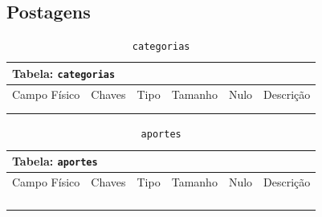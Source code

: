 \documentclass[12pt,a4paper]{article}
\begin{document}
\subsection{Postagens}


\begin{center}
\begin{table}[h!]
	\caption{\texttt{categorias}}
	\label{tabela:categorias}
	\begin{tabular}{|p{2.5cm}|p{1cm}|p{1.25cm}|p{1.75cm}|p{1.25cm}|p{5cm}|}\hline	
		\multicolumn{6}{|p{16cm}|}{\cellcolor{cinzaClaro}  \centering Tabela: \texttt{categorias}} \\ \hline %
		{\small Campo Físico}   & {\small Chaves} & {\small Tipo} & {\small Tamanho} & {\small Nulo} & {\small Descrição}\\\hline %
		
		{\tiny } & {\tiny } & {\tiny } & {\tiny } & {\tiny } &{\tiny }\\\hline
		{\tiny } & {\tiny } & {\tiny } & {\tiny } & {\tiny } &{\tiny }\\\hline
		
			
	\end{tabular}
\end{table}	
\end{center}

\begin{center}
\begin{table}[h!]
	\caption{\texttt{aportes}}
	\label{tabela:aportes}
	\begin{tabular}{|p{2.5cm}|p{1cm}|p{1.25cm}|p{1.75cm}|p{1.25cm}|p{5cm}|}\hline	
		\multicolumn{6}{|p{16cm}|}{\cellcolor{cinzaClaro}  \centering Tabela: \texttt{aportes}} \\ \hline %
		{\small Campo Físico}   & {\small Chaves} & {\small Tipo} & {\small Tamanho} & {\small Nulo} & {\small Descrição}\\\hline %
		
		{\tiny } & {\tiny } & {\tiny } & {\tiny } & {\tiny } &{\tiny }\\\hline
		{\tiny } & {\tiny } & {\tiny } & {\tiny } & {\tiny } &{\tiny }\\\hline
		{\tiny } & {\tiny } & {\tiny } & {\tiny } & {\tiny } &{\tiny }\\\hline
		{\tiny } & {\tiny } & {\tiny } & {\tiny } & {\tiny } &{\tiny }\\\hline
			
	\end{tabular}
\end{table}	
\end{center}
\end{document}
